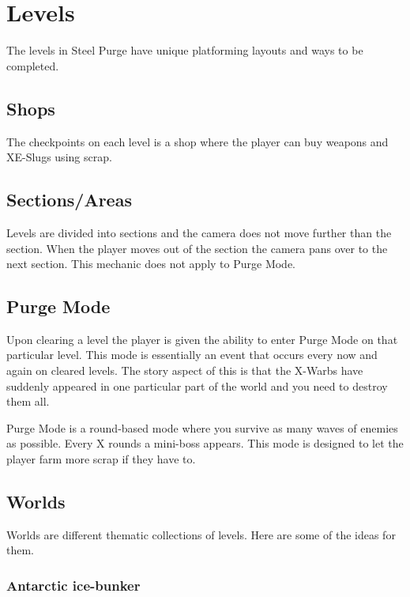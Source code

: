 \documentclass[../Main.tex]{subfiles}
\begin{document}
\section{Levels}

The levels in Steel Purge have unique platforming layouts and ways to be completed.

\subsection{Shops}

The checkpoints on each level is a shop where the player can buy weapons and XE-Slugs using scrap.

\subsection{Sections/Areas}

Levels are divided into sections and the camera does not move further than the section. When the player moves out of the section the camera pans over to the next section. This mechanic does not apply to Purge Mode.

\subsection{Purge Mode}

Upon clearing a level the player is given the ability to enter Purge Mode on that particular level. This mode is essentially an event that occurs every now and again on cleared levels. The story aspect of this is that the X-Warbs have suddenly appeared in one particular part of the world and you need to destroy them all.

Purge Mode is a round-based mode where you survive as many waves of enemies as possible. Every X rounds a mini-boss appears. This mode is designed to let the player farm more scrap if they have to.

\subsection{Worlds}

Worlds are different thematic collections of levels. Here are some of the ideas for them.

\subsubsection{Antarctic ice-bunker}
\end{document}
